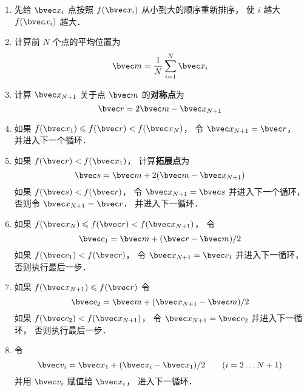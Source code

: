 \begin{enumerate}
\item 先给 $\bvec x_i$ 点按照 $f(\bvec x_i)$ 从小到大的顺序重新排序， 使 $i$ 越大 $f(\bvec x_i)$ 越大．

\item 计算前 $N$ 个点的平均位置为
\begin{equation}
\bvec m = \frac1N \sum_{i=1}^N \bvec x_i
\end{equation}

\item 计算 $\bvec x_{N + 1}$ 关于点 $\bvec m$ 的\textbf{对称点}为
\begin{equation}
\bvec r = 2\bvec m - \bvec x_{N + 1}
\end{equation}

\item 如果 $f(\bvec x_1) \leqslant f(\bvec r) < f(\bvec x_N)$， 令 $\bvec x_{N+1} = \bvec r$， 并进入下一个循环．

\item 如果 $f(\bvec r) < f(\bvec x_1)$， 计算\textbf{拓展点}为
\begin{equation}
\bvec s = \bvec m + 2(\bvec m - \bvec x_{N+1})
\end{equation}
如果 $f(\bvec s) < f(\bvec r)$， 令 $\bvec x_{N+1} = \bvec s$ 并进入下一个循环， 否则令 $\bvec x_{N+1} = \bvec r$． 并进入下一循环．

\item 如果 $f(\bvec x_N) \leqslant f(\bvec r) < f(\bvec x_{N+1})$， 令
\begin{equation}
\bvec c_1 = \bvec m + (\bvec r - \bvec m)/2
\end{equation}
如果 $f(\bvec c_1) < f(\bvec r)$， 令 $\bvec x_{N + 1} = \bvec c_1$ 并进入下一循环， 否则执行最后一步．

\item 如果 $f(\bvec x_{N+1}) \leqslant f(\bvec r)$ 令
\begin{equation}
\bvec c_2 = \bvec m + (\bvec x_{N+1} - \bvec m)/2
\end{equation}
如果 $f(\bvec c_2) < f(\bvec x_{N+1})$， 令 $\bvec x_{N+1}  = \bvec c_2$ 并进入下一循环， 否则执行最后一步．

\item 令
\begin{equation}
\bvec v_i = \bvec x_1 + (\bvec x_i - \bvec x_1)/2 \qquad (i = 2\dots N+1)
\end{equation}
并用 $\bvec v_i$ 赋值给 $\bvec x_i$， 进入下一循环．
\end{enumerate}

